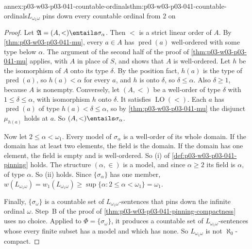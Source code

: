 \begin{annexitem}{annex:p03-w03-p03-041-countable-ordinals}{thm:p03-w03-p03-041-countable-ordinals}{\(L_{\omega_1\omega}\) pins down every countable ordinal from \(2\) on}
\begin{proof}
Let \(\mathfrak A=(A,<)\entails\sigma_\alpha\). Then \(<\) is a strict
linear order of \(A\). By \cref{thm:p03-w03-p03-041-mu}, every \(a\in A\)
has \(\operatorname{pred}(a)\) well-ordered with some type below
\(\alpha\). The argument of the second half of the proof of
\cref{thm:p03-w03-p03-041-mu} applies, with \(A\) in place of \(S\), and
shows that \(A\) is well-ordered. Let \(h\) be the isomorphism of \(A\)
onto its type \(\delta\). By the position fact,
\(h(a)\) is the type of \(\operatorname{pred}(a)\), so \(h(a)<\alpha\)
for every \(a\), and \(h\) is onto \(\delta\), so \(\delta\leq\alpha\). Also
\(\delta\geq1\), because \(A\) is nonempty. Conversely, let \((A,<)\) be a
well-order of type \(\delta\) with \(1\leq\delta\leq\alpha\), with
isomorphism \(h\) onto \(\delta\). It satisfies
\(\operatorname{LO}(<)\). Each \(a\) has \(\operatorname{pred}(a)\) of
type \(h(a)<\delta\leq\alpha\), so by \cref{thm:p03-w03-p03-041-mu} the
disjunct \(\mu_{h(a)}\) holds at \(a\). So \((A,<)\entails\sigma_\alpha\).

Now let \(2\leq\alpha<\omega_1\). Every model of \(\sigma_\alpha\) is a
well-order of its whole domain. If the domain has at least two elements,
the field is the domain. If the domain has one element, the field is empty
and is well-ordered. So (i) of \cref{def:p03-w03-p03-041-pinning} holds.
The structure \((\alpha,\in)\) is a model, and since \(\alpha\geq2\) its
field is \(\alpha\), of type \(\alpha\). So (ii) holds. Since
\(\{\sigma_\alpha\}\) has one member,
\(w(L_{\omega_1\omega})=w_1(L_{\omega_1\omega})\geq
\sup\{\alpha:2\leq\alpha<\omega_1\}=\omega_1\).

Finally, \(\{\sigma_\omega\}\) is a countable set of
\(L_{\omega_1\omega}\)-sentences that pins down the infinite ordinal
\(\omega\). Step~B of the proof of
\cref{thm:p03-w03-p03-041-pinning-compactness} uses no choice. Applied to
\(\Phi=\{\sigma_\omega\}\), it produces a countable set of
\(L_{\omega_1\omega}\)-sentences whose every finite subset has a model and
which has none. So \(L_{\omega_1\omega}\) is not \(\aleph_0\)-compact.
\end{proof}
\end{annexitem}

